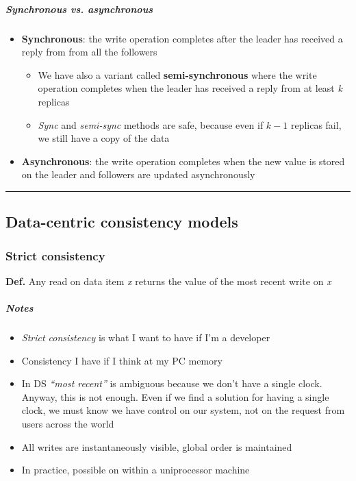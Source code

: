 \subparagraph{Synchronous vs. asynchronous}

\begin{itemize}
    \item
      \textbf{Synchronous}: the write operation completes after the leader
      has received a reply from from all the followers
    \begin{itemize}
        \item
          We have also a variant called \textbf{semi-synchronous} where the
          write operation completes when the leader has received a reply from at
          least \emph{k} replicas
        \item
          \emph{Sync} and \emph{semi-sync} methods are safe, because even if
          $k-1$ replicas fail, we still have a copy of the data
    \end{itemize}
    
    \item
      \textbf{Asynchronous}: the write operation completes when the new
      value is stored on the leader and followers are updated asynchronously
\end{itemize}

\begin{center}\rule{3in}{0.4pt}\end{center}

\subsection{Data-centric consistency models}

\subsubsection{Strict consistency}

\textbf{Def.} Any read on data item \emph{x} returns the value of the
most recent write on \emph{x}

\subparagraph{Notes}

\begin{itemize}
    \item
      \emph{Strict consistency} is what I want to have if I'm a developer
    \item
      Consistency I have if I think at my PC memory
    \item
      In DS \emph{``most recent''} is ambiguous because we don't have a
      single clock. Anyway, this is not enough. Even if we find a solution for having a single
      clock, we must know we have control on our system, not on the request
      from users across the world
    \item
      All writes are instantaneously visible, global order is maintained
    \item
      In practice, possible on within a uniprocessor machine
\end{itemize}

